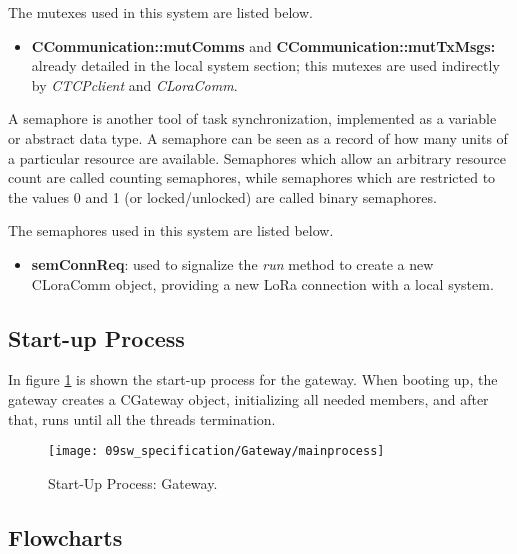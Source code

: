
The mutexes used in this system are listed below.

\begin{itemize}
	\item \textbf{CCommunication::mutComms} and \textbf{CCommunication::mutTxMsgs:} already detailed in the local system section; this mutexes are used indirectly by \textit{CTCPclient} and \textit{CLoraComm}.
\end{itemize}


A semaphore is another tool of task synchronization, implemented as a variable or abstract data type. A semaphore can be seen as a record of how many units of a particular resource are available. Semaphores which allow an arbitrary resource count are called counting semaphores, while semaphores which are restricted to the values 0 and 1 (or locked/unlocked) are called binary semaphores.

The semaphores used in this system are listed below.
\begin{itemize}
	\item \textbf{semConnReq}: used to signalize the \textit{run} method to create a new CLoraComm object, providing a new LoRa connection with a local system.
\end{itemize}
\subsection{Start-up Process}
In figure \ref{fig:bootGateway} is shown the start-up process for the gateway. When booting up, the gateway creates a CGateway object, initializing all needed members, and after that, runs until all the threads termination.

\begin{figure}[H]
	\centering		\texttt{[image: 09sw\_specification/Gateway/mainprocess]}
	\caption{Start-Up Process: Gateway.}
	\label{fig:bootGateway}
\end{figure}

\clearpage
\subsection{Flowcharts}

